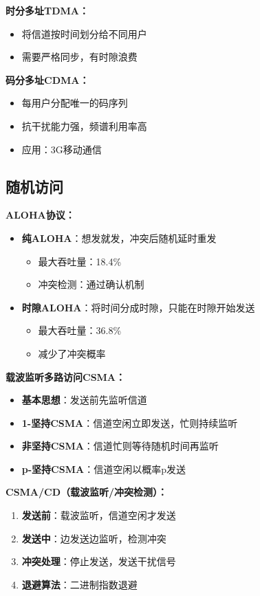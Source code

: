 \documentclass[lang=cn,newtx,10pt,scheme=chinese]{../../elegantbook}
\begin{document}
\textbf{时分多址TDMA：}
\begin{itemize}
  \item 将信道按时间划分给不同用户
  \item 需要严格同步，有时隙浪费
\end{itemize}

\textbf{码分多址CDMA：}
\begin{itemize}
  \item 每用户分配唯一的码序列
  \item 抗干扰能力强，频谱利用率高
  \item 应用：3G移动通信
\end{itemize}

\subsection{随机访问}

\textbf{ALOHA协议：}
\begin{itemize}
  \item \textbf{纯ALOHA}：想发就发，冲突后随机延时重发
    \begin{itemize}
      \item 最大吞吐量：18.4\%
      \item 冲突检测：通过确认机制
    \end{itemize}
  \item \textbf{时隙ALOHA}：将时间分成时隙，只能在时隙开始发送
    \begin{itemize}
      \item 最大吞吐量：36.8\%
      \item 减少了冲突概率
    \end{itemize}
\end{itemize}

\textbf{载波监听多路访问CSMA：}
\begin{itemize}
  \item \textbf{基本思想}：发送前先监听信道
  \item \textbf{1-坚持CSMA}：信道空闲立即发送，忙则持续监听
  \item \textbf{非坚持CSMA}：信道忙则等待随机时间再监听
  \item \textbf{p-坚持CSMA}：信道空闲以概率p发送
\end{itemize}

\textbf{CSMA/CD（载波监听/冲突检测）：}
\begin{enumerate}
  \item \textbf{发送前}：载波监听，信道空闲才发送
  \item \textbf{发送中}：边发送边监听，检测冲突
  \item \textbf{冲突处理}：停止发送，发送干扰信号
  \item \textbf{退避算法}：二进制指数退避
\end{enumerate}
\end{document}
